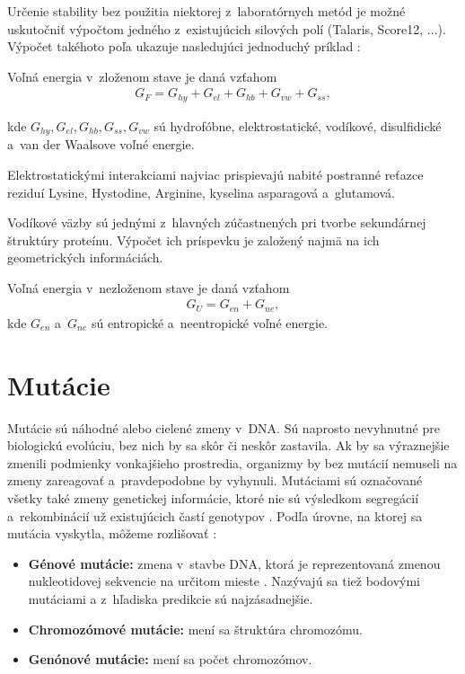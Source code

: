 Určenie stability bez použitia niektorej z~laboratórnych metód je možné uskutočniť výpočtom jedného z~existujúcich silových polí (Talaris, Score12, ...). Výpočet takéhoto poľa ukazuje nasledujúci jednoduchý príklad \cite{free_energy} \cite{gromiha}:

Voľná energia v~zloženom stave je daná vzťahom  
	\begin{align}
		G_{F} = G_{hy} + G_{el} + G_{hb} + G_{vw} + G_{ss},
	\end{align}

kde $G_{hy}, G_{el}, G_{hb}, G_{ss}, G_{vw}$ sú hydrofóbne, elektrostatické, vodíkové, disulfidické a~van der Waalsove voľné energie. 


Elektrostatickými interakciami najviac prispievajú nabité postranné reťazce reziduí Lysine, Hystodine, Arginine, kyselina asparagová a~glutamová.

Vodíkové väzby sú jednými z~hlavných zúčastnených pri tvorbe sekundárnej štruktúry proteínu. Výpočet ich príspevku je založený najmä na ich geometrických informáciách.

Voľná energia v~nezloženom stave je daná vzťahom
\begin{align}
	G_U = G_{en} + G_{ne},
\end{align}
kde $G_{en}$ a~$G_{ne}$ sú entropické a~neentropické voľné energie.


\section{Mutácie}
Mutácie sú náhodné alebo cielené zmeny v~DNA. Sú naprosto nevyhnutné pre biologickú evolúciu, bez nich by sa skôr či neskôr zastavila. Ak by sa výraznejšie zmenili podmienky vonkajšieho prostredia, organizmy by bez mutácií nemuseli na zmeny zareagovať a~pravdepodobne by vyhynuli. Mutáciami sú označované všetky také zmeny genetickej informácie, ktoré nie sú výsledkom segregácií a~rekombinácií už existujúcich častí genotypov \cite{mutace}. 
Podľa úrovne, na ktorej sa mutácia vyskytla, môžeme rozlišovať \cite{flegr}:
\begin{itemize}
	\item \textbf{Génové mutácie:} zmena v~stavbe DNA, ktorá je reprezentovaná zmenou nukleotidovej sekvencie na určitom mieste \cite{mutace}. Nazývajú sa tiež bodovými mutáciami a z~hľadiska predikcie sú najzásadnejšie.
	\item \textbf{Chromozómové mutácie:} mení sa štruktúra chromozómu.
	\item \textbf{Genónové mutácie:} mení sa počet chromozómov.
\end{itemize}

